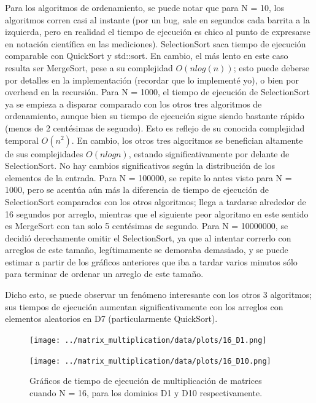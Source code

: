 Para los algoritmos de ordenamiento, se puede notar que para N = 10, los algoritmos corren casi al instante (por un bug, sale en segundos cada barrita a la izquierda, pero en realidad el tiempo de ejecución es chico al punto de expresarse en notación científica en las mediciones). SelectionSort saca tiempo de ejecución comparable con QuickSort y std::sort. En cambio, el más lento en este caso resulta ser MergeSort, pese a su complejidad $O(nlog(n))$; esto puede deberse por detalles en la implementación (recordar que lo implementé yo), o bien por overhead en la recursión.
\newline \newline
Para N = 1000, el tiempo de ejecución de SelectionSort ya se empieza a disparar comparado con los otros tres algoritmos de ordenamiento, aunque bien su tiempo de ejecución sigue siendo bastante rápido (menos de 2 centésimas de segundo). Esto es reflejo de su conocida complejidad temporal $O(n^2)$. En cambio, los otros tres algoritmos se benefician altamente de sus complejidades $O(nlogn)$, estando significativamente por delante de SelectionSort. No hay cambios significativos según la distribución de los elementos de la entrada.
\newline \newline
Para N = 100000, se repite lo antes visto para N = 1000, pero se acentúa aún más la diferencia de tiempo de ejecución de SelectionSort comparados con los otros algoritmos; llega a tardarse alrededor de 16 segundos por arreglo, mientras que el siguiente peor algoritmo en este sentido es MergeSort con tan solo 5 centésimas de segundo.
\newline \newline
Para N = 10000000, se decidió derechamente omitir el SelectionSort, ya que al intentar correrlo con arreglos de este tamaño, legítimamente se demoraba demasiado, y se puede estimar a partir de los gráficos anteriores que iba a tardar varios minutos sólo para terminar de ordenar un arreglo de este tamaño.

Dicho esto, se puede observar un fenómeno interesante con los otros 3 algoritmos; sus tiempos de ejecución aumentan significativamente con los arreglos con elementos aleatorios en D7 (particularmente QuickSort).
\newline
\begin{figure}[H]
    \centering
    \begin{minipage}[t]{0.5\textwidth}
        \texttt{[image: ../matrix\_multiplication/data/plots/16\_D1.png]}
    \end{minipage}%
    \begin{minipage}[t]{0.5\textwidth}
        \texttt{[image: ../matrix\_multiplication/data/plots/16\_D10.png]}
     \end{minipage}%
    \caption{Gráficos de tiempo de ejecución de multiplicación de matrices cuando N = 16, para los dominios D1 y D10 respectivamente.}
    \label{fig:matrixN2}
\end{figure}

